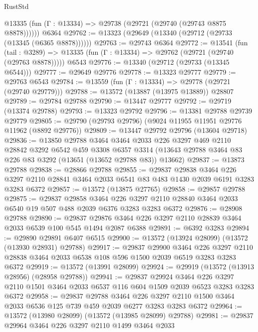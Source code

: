\begin{lexlean}{RustStd}
\begin{coremodule}
      @13335 (fun (Γ : @13334) => @29738 (@29721 (@29740 (@29743 @8875 @8878))))))
    @6364
@29762 := @13323 (@29649 (@13340 (@29712 (@29733 (@13345 (@6365 @8878))))))
@29763 := @29743 @6364
@29772 := @13541
    (fun (tail : @3289) => @13335 (fun (Γ : @13334) => @29762 (@29721 (@29740 (@29763 @8878)))))
    @6543
@29776 := @13340 (@29712 (@29733 (@13345 @6544)))
@29777 := @29649 @29776
@29778 := @13323 @29777
@29779 := @29763 @6543
@29784 := @13559 (fun (Γ : @13334) => @29778 (@29721 (@29740 @29779)))
@29788 := @13572 (@13887 (@13975 @13889)) @28807
@29789 := @29784 @29788
@29790 := @13447 @29777
@29792 := @29719 (@13374 @29788)
@29793 := @13323 @29792
@29796 := @13381 @29788 @29739 @29779
@29805 := @29790 (@29793 @29796) (@9024 @11955 @11951 @29776 @11962 (@8892 @29776))
@29809 := @13447 @29792 @29796 (@13604 @29718)
@29836 := @13850
    @29788
    @3464
    @3464
    @2033
    @226
    @3297
    @469
    @2110
    @28842
    @3292
    @6542
    @459
    @3308
    @6357
    @3314
    (@13643 @29788 @3464 @83 @226 @83 @3292 (@13651 (@13652 @29788 @83)) @13662)
@29837 := @13873 @29788
@29838 := @28866 @29788
@29855 := @29837
    @29838
    @3464
    @226
    @3297
    @2110
    @28841
    @3464
    @2033
    @6541
    @83
    @483
    @1430
    @2039
    @6191
    @3283
    @3283
    @6372
@29857 := @13572 (@13875 @27765)
@29858 := @29857 @29788
@29875 := @29837
    @29858
    @3464
    @226
    @3297
    @2110
    @28840
    @3464
    @2033
    @6540
    @19
    @507
    @488
    @2039
    @6376
    @3283
    @3283
    @6372
@29876 := @28908 @29788
@29890 := @29837 @29876 @3464 @226 @3297 @2110 @28839 @3464 @2033 @6539 @100 @545 @1494 @2087 @6388
@29891 := @6392 @3283
@29894 := @29890 @29891 @6407 @6515
@29900 := @13572 (@13924 @28099) (@13572 (@13930 @28931) @29788)
@29917 := @29837
    @29900
    @3464
    @226
    @3297
    @2110
    @28838
    @3464
    @2033
    @6538
    @108
    @596
    @1500
    @2039
    @6519
    @3283
    @3283
    @6372
@29919 := @13572 (@13991 @28099)
@29924 := @29919 (@13572 (@13913 @28956) (@28958 @29788))
@29941 := @29837
    @29924
    @3464
    @226
    @3297
    @2110
    @1501
    @3464
    @2033
    @6537
    @116
    @604
    @1509
    @2039
    @6523
    @3283
    @3283
    @6372
@29958 := @29837
    @29788
    @3464
    @226
    @3297
    @2110
    @1500
    @3464
    @2033
    @6536
    @125
    @739
    @459
    @2039
    @6277
    @3283
    @3283
    @6372
@29964 := @13572 (@13980 @28099) (@13572 (@13985 @28099) @29788)
@29981 := @29837
    @29964
    @3464
    @226
    @3297
    @2110
    @1499
    @3464
    @2033

\end{coremodule}
\end{lexlean}
